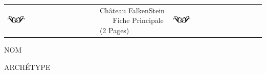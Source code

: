\documentclass[a5paper,pagesize,french]{book}
\begin{document}
\begin{center}
	\begin{tabular}[c]{ p{} p{} p{} }
		\includegraphics[width=0.20\textwidth]{../../images/artsdecos/ornement08whiteBG.png} & 
			\centering
			{ \Huge{\setmainfont{Chomsky} Château FalkenStein } }~\newline~\newline~\newline
			{ \LARGE{ \setmainfont{Z003} Fiche Principale (2 Pages) } }
		& \includegraphics[width=0.20\textwidth]{../../images/artsdecos/ornement08whiteBG.png} \\
	\end{tabular}
\end{center}

\begin{minipage}[ht]{0.48\textwidth}
	NOM~\newline
\end{minipage} \hfill \begin{minipage}[ht]{0.48\textwidth}
	ARCHÉTYPE~\newline
\end{minipage}~\\~\\

\end{document}
